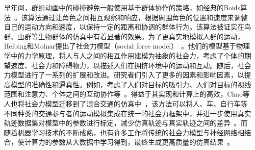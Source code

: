 早年间，群组动画中的碰撞避免一般使用基于群体协作的策略，如经典的Boids算法~\cite{reynolds1987flocks, reynolds1999steering}。该算法通过让角色之间相互观察和响应，根据周围角色的位置和速度来调整自己的运动方向和速度，以保持一定的距离和协调的群体行为。该算法被证实在鸟群、虫群等生物群体的仿真中有着显著的效果。为了更真实地模拟人群的运动，Helbing和Molnar提出了社会力模型（social force model）~\cite{helbing1995social}。他们的模型基于物理学中的力学原理，将人与人之间的相互作用建模为抽象的社会力，考虑了个体的期望速度、社会力和障碍物力，以描述人们在拥挤环境中的运动和互动。随后，社会力模型进行了一系列的扩展和改进。研究者们引入了更多的因素和影响因素，以提高模型的准确性和逼真性。例如，考虑了人们对目标的吸引力、人们对目标的视线范围和注意力、个体之间的互动协作等~\cite{helbing2000simulating, zanlungo2011social, yang2014guided, li2021force}。得益于其实现和计算上的高效，Chao等人也将社会力模型迁移到了混合交通的仿真中~\cite{chao2019force}，该方法可以将人、车、自行车等不同种类的交通参与者的运动模拟集成在统一的社会力框架中，并进一步使用真实轨迹数据集对模型中的参数进行标定，减少仿真轨迹与真实轨迹之间的差异~\cite{chao2021calibrated}。而随着机器学习技术的不断成熟，也有许多工作将传统的社会力模型与神经网络相结合，使计算力的参数从大数据中学习得到，最终生成更高质量的仿真结果~\cite{li2019simulation, kreiss2021deep, yue2022human}。



